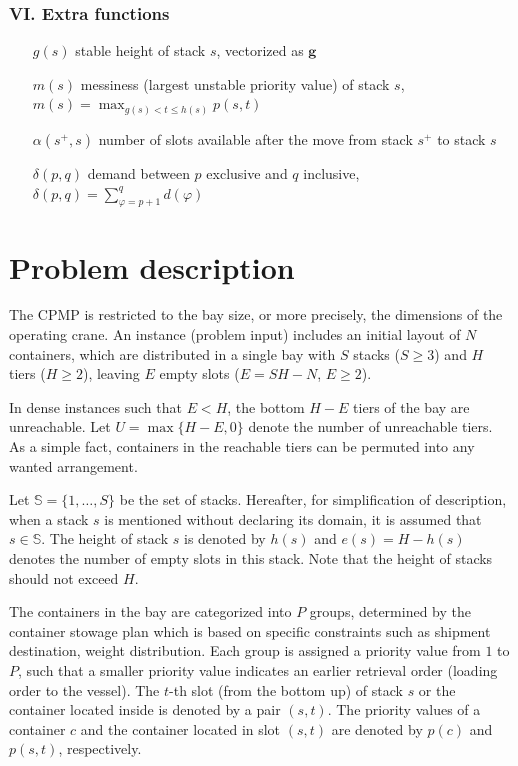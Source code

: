 \documentclass[review,3p,times,12pt,number]{elsarticle}\usepackage{amsmath}\usepackage{amssymb}
\begin{document}
\subsubsection*{VI\@. Extra functions}
\begin{enumerate}[noitemsep, align=LabelCenter,labelwidth=\mylongest,leftmargin=!]
\item[$g(s)$] stable height of stack $s$, vectorized as $\boldsymbol{ g}$
\item[$m(s)$] messiness (largest unstable priority value) of stack $s$, $m(s)=\max_{ g(s)<t\le h(s)}p(s,t)$
\item[$\alpha(s^+,s)$] number of slots available after the move from stack $s^+$ to stack $s$
\item[$\delta(p,q)$] demand between $p$ exclusive and $q$ inclusive, $\delta(p,q)=\sum_{\varphi=p+1}^{q}d(\varphi)$
\end{enumerate}


\section{Problem description}
\label{sec:problem}

The CPMP is restricted to the bay size, or more precisely, the dimensions of the operating crane. An instance (problem input) includes an initial layout of $N$ containers, which are distributed in a single bay with $S$ stacks ($S\ge 3$) and $H$ tiers ($H\ge 2$), leaving $E$ empty slots ($E=SH-N$, $E\ge 2$).



In dense instances such that $E<H$, the bottom $H-E$ tiers of the bay are unreachable. Let $U=\max\{H-E,0\}$ denote the number of unreachable tiers. As a simple fact, containers in the reachable tiers can be permuted into any wanted arrangement.

Let $\mathbb{S}=\{1,\dots,S\}$ be the set of stacks. Hereafter, for simplification of description, when a stack $s$ is mentioned without declaring its domain, it is assumed that $s\in\mathbb{S}$. The height of stack $s$ is denoted by $h(s)$ and $e(s)=H-h(s)$ denotes the number of empty slots in this stack. Note that the height of stacks should not exceed $H$.

The containers in the bay are categorized into $P$ groups, determined by the container stowage plan which is based on specific constraints such as shipment destination, weight distribution. Each group is assigned a priority value from $1$ to $P$, such that a smaller priority value indicates an earlier retrieval order (loading order to the vessel). The $t$-th slot (from the bottom up) of stack $s$ or the container located inside is denoted by a pair $(s,t)$. 
The priority values of a container $c$ and the container located in slot $(s,t)$ are denoted by $p(c)$ and $p(s,t)$, respectively.
\end{document}
